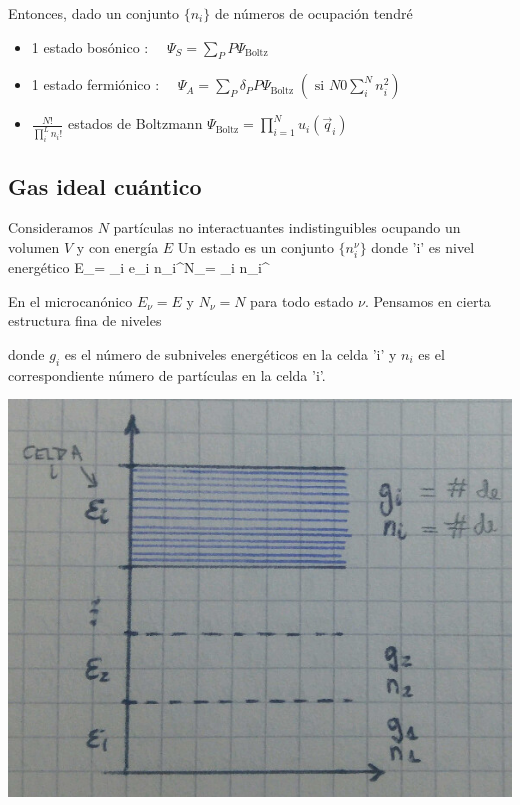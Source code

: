 \documentclass[10pt,oneside]{CBFT_book}
\begin{document}
Entonces, dado un conjunto $ \{ n_i \} $ de números de ocupación tendré 

\begin{itemize}
\item 1 estado bosónico : $ \quad \Psi_S = \sum_P P \Psi_{\text{Boltz}}$
\item 1 estado fermiónico : $ \quad \Psi_A = \sum_P \delta_P P \Psi_{\text{Boltz}} 
	\; (\text{ si } N 0 \sum_i^N n_i^2 )$
\item $ \frac{N!}{\prod_i^L n_i!} $ estados de Boltzmann $ \Psi_{\text{Boltz}} = \prod_{i=1}^N u_i(\vec{q}_i) $
\end{itemize}


\subsection{Gas ideal cuántico}

Consideramos $N$ partículas no interactuantes indistinguibles ocupando un volumen $V$ y con energía $E$
Un estado es un conjunto $ \{ n_i^\nu \} $ donde 'i' es nivel energético
\be
	E_\nu = \sum_i e_i n_i^\nu \qquad \qquad N_\nu = \sum_i n_i^\nu
	\label{cond_EN}
\ee

En el microcanónico $ E_\nu = E $ y $ N_\nu = N $ para todo estado $\nu$. Pensamos en cierta estructura 
fina de niveles


donde $g_i$ es el número de subniveles energéticos en la celda 'i' y $n_i$ es el correspondiente número de
partículas en la celda 'i'.

\includegraphics[scale=0.35]{images/1625623752.jpg}
\end{document}

